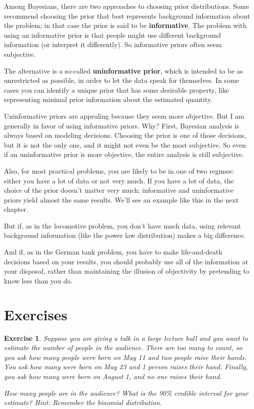 \documentclass[12pt]{book}
\theoremstyle{exercise}
\newtheorem{exercise}{Exercise}[chapter]
\begin{document}
Among Bayesians, there are two approaches to choosing prior
distributions.  Some recommend choosing the prior that best represents
background information about the problem; in that case the prior
is said to be {\bf informative}.  The problem with using an informative
prior is that people might use different background information (or
interpret it differently).  So informative priors often seem subjective.

The alternative is a so-called {\bf uninformative prior}, which is
intended to be as unrestricted as possible, in order to let the data
speak for themselves.  In some cases you can identify a unique prior
that has some desirable property, like representing minimal prior
information about the estimated quantity.

Uninformative priors are appealing because they seem more
objective.  But I am generally in favor of using informative priors.
Why?  First, Bayesian analysis is always based on
modeling decisions.  Choosing the prior is one of those decisions, but
it is not the only one, and it might not even be the most subjective.
So even if an uninformative prior is more objective, the entire analysis
is still subjective.


Also, for most practical problems, you are likely to be in one of two
regimes: either you have a lot of data or not very much.  If you have
a lot of data, the choice of the prior doesn't matter very much;
informative and uninformative priors yield almost the same results.
We'll see an example like this in the next chapter.

But if, as in the locomotive problem, you don't have much data,
using relevant background information (like the power law distribution)
makes a big difference.

And if, as in the German tank problem, you have to make life-and-death
decisions based on your results, you should probably use all of the
information at your disposal, rather than maintaining the illusion of
objectivity by pretending to know less than you do.


\section{Exercises}

\begin{exercise}
Suppose you are giving a talk in a large lecture hall and you want to estimate the number of people in the audience.  There are too many to count, so you ask how many people were born on May 11 and two people raise their hands.  You ask how many were born on May 23 and 1 person raises their hand.  Finally, you ask how many were born on August 1, and no one raises their hand.

How many people are in the audience?  What is the 90\% credible interval for your estimate?  Hint: Remember the binomial distribution.
\end{exercise}
\end{document}
